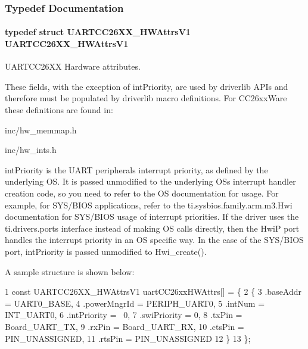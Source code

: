 \subsubsection{Typedef Documentation}
\paragraph[{U\+A\+R\+T\+C\+C26\+X\+X\+\_\+\+H\+W\+Attrs\+V1}]{\setlength{\rightskip}{0pt plus 5cm}typedef struct {\bf U\+A\+R\+T\+C\+C26\+X\+X\+\_\+\+H\+W\+Attrs\+V1}  {\bf U\+A\+R\+T\+C\+C26\+X\+X\+\_\+\+H\+W\+Attrs\+V1}}\label{_u_a_r_t_c_c26_x_x_8h_a17c84d23401f09a0060deecf660018eb}


U\+A\+R\+T\+C\+C26\+X\+X Hardware attributes. 

These fields, with the exception of int\+Priority, are used by driverlib A\+P\+Is and therefore must be populated by driverlib macro definitions. For C\+C26xx\+Ware these definitions are found in\+:
\begin{DoxyItemize}
\item inc/hw\+\_\+memmap.\+h
\item inc/hw\+\_\+ints.\+h
\end{DoxyItemize}

int\+Priority is the U\+A\+R\+T peripheral\textquotesingle{}s interrupt priority, as defined by the underlying O\+S. It is passed unmodified to the underlying O\+S\textquotesingle{}s interrupt handler creation code, so you need to refer to the O\+S documentation for usage. For example, for S\+Y\+S/\+B\+I\+O\+S applications, refer to the ti.\+sysbios.\+family.\+arm.\+m3.\+Hwi documentation for S\+Y\+S/\+B\+I\+O\+S usage of interrupt priorities. If the driver uses the ti.\+drivers.\+ports interface instead of making O\+S calls directly, then the Hwi\+P port handles the interrupt priority in an O\+S specific way. In the case of the S\+Y\+S/\+B\+I\+O\+S port, int\+Priority is passed unmodified to Hwi\+\_\+create().

A sample structure is shown below\+: 
\begin{DoxyCode}
1 const UARTCC26XX\_HWAttrsV1 uartCC26xxHWAttrs[] = \{
2     \{
3         .baseAddr    = UART0\_BASE,
4         .powerMngrId = PERIPH\_UART0,
5         .intNum      = INT\_UART0,
6         .intPriority = ~0,
7         .swiPriority = 0,
8         .txPin       = Board\_UART\_TX,
9         .rxPin       = Board\_UART\_RX,
10         .ctsPin      = PIN\_UNASSIGNED,
11         .rtsPin      = PIN\_UNASSIGNED
12     \}
13 \};
\end{DoxyCode}


